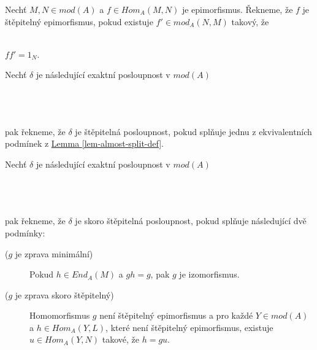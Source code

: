      \begin{dfn}
       \begin{description} \item
         \item[(a)] Nechť $M,N\in mod(A)$ a $f\in Hom_A(M,N)$ je epimorfismus. 
         Řekneme, že $f$ je štěpitelný epimorfismus, pokud existuje $f'\in mod_A(N,M)$
         takový, že \\\\ 
         \centerline{$ff'=1_N$.}
         \item[(b)] Nechť $\delta$ je následující exaktní posloupnost v $mod(A)$\\\\
           \centerline{}\\\\
           pak řekneme, že $\delta$ je štěpitelná posloupnost, pokud 
             splňuje jednu z ekvivalentních podmínek z 
             \hyperref[lem-almost-split-def]{Lemma \ref*{lem-almost-split-def}}.      
       \end{description}         
     \end{dfn}
     
     \begin{dfn}
         Nechť $\delta$ je následující exaktní posloupnost v $mod(A)$\\\\
           \centerline{}\\\\
           pak řekneme, že $\delta$ je skoro štěpitelná posloupnost, pokud 
         splňuje následující dvě podmínky:                
         \begin{description}  
           \item[($g$ je zprava minimální)] Pokud $h\in End_A(M)$ a $gh=g$, pak $g$ je izomorfismus.
           \item[($g$ je zprava skoro štěpitelný)]  Homomorfismus $g$ není štěpitelný epimorfismus a pro 
             každé $Y\in mod(A)$ a $h\in 
             Hom_A(Y,L)$, které není štěpitelný epimorfismus, existuje $u\in Hom_A(Y,N)$ 
             takové, že $h=gu$.\\\\
             \centerline{}\\
       \end{description}         
     \end{dfn}     
     
